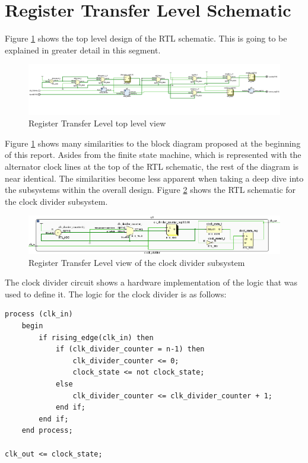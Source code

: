 \documentclass[12pt,a4paper]{article}
\begin{document}
\section{Register Transfer Level Schematic}

Figure \ref{fig:rtl} shows the top level design of the RTL schematic. This is going to be explained in greater detail in this segment.

\begin{figure}[H]
    \centering
    \includegraphics[scale=0.1]{images/rtl_whole.png}
    \caption{Register Transfer Level top level view}
    \label{fig:rtl}
\end{figure}

Figure \ref{fig:rtl} shows many similarities to the block diagram proposed at the beginning of this report. Asides from the finite state machine, which is represented with the alternator clock lines at the top of the RTL schematic, the rest of the diagram is near identical. The similarities become less apparent when taking a deep dive into the subsystems within the overall design. Figure \ref{fig:rtl_clk_div} shows the RTL schematic for the clock divider subsystem.

\begin{figure}[H]
    \centering
    \includegraphics[scale=0.25]{images/rtl_clk_div.png}
    \caption{Register Transfer Level view of the clock divider subsystem}
    \label{fig:rtl_clk_div}
\end{figure}

The clock divider circuit shows a hardware implementation of the logic that was used to define it. The logic for the clock divider is as follows:

\begin{verbatim}
process (clk_in)
    begin
        if rising_edge(clk_in) then
            if (clk_divider_counter = n-1) then
                clk_divider_counter <= 0;
                clock_state <= not clock_state;
            else
                clk_divider_counter <= clk_divider_counter + 1;
            end if;
        end if;
    end process;

clk_out <= clock_state;
\end{verbatim}
\end{document}
